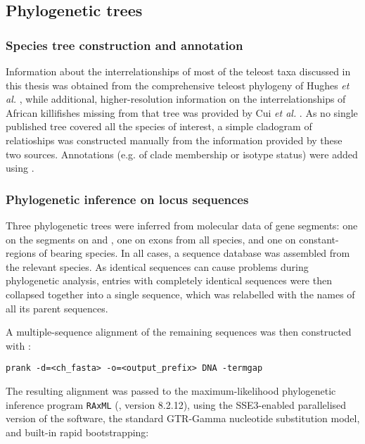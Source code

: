 \subsection{Phylogenetic trees}
\label{sec:methods_comp_trees}


\subsubsection{Species tree construction and annotation}
\label{sec:methods_comp_trees_species}

Information about the interrelationships of most of the teleost taxa discussed in this thesis was obtained from the comprehensive teleost phylogeny of Hughes \textit{et al.} \parencite{hughes2018teleostphylo}, while additional, higher-resolution information on the interrelationships of African killifishes missing from that tree was provided by Cui \textit{et al.} \parencite{cui2019annual}. As no single published tree covered all the species of interest, a simple cladogram of relatioships was constructed manually from the information provided by these two sources. Annotations (e.g. of clade membership or isotype status) were added using  \parencite{guangchuang2018tidytree}.

\subsubsection{Phylogenetic inference on \igh{} locus sequences}
\label{sec:methods_comp_trees_phylo}

Three phylogenetic trees were inferred from molecular data of  gene segments: one on the \vh segments on \nfu and \xma, one on \ch exons from all species, and one on  constant-regions of  bearing species. In all cases, a sequence  database was assembled from the relevant species. As identical sequences can cause problems during phylogenetic analysis, entries with completely identical sequences  were then collapsed together into a single  sequence, which was relabelled with the names of all its parent sequences. 

A multiple-sequence alignment of the remaining sequences was then constructed with :

\begin{lstlisting}
prank -d=<ch_fasta> -o=<output_prefix> DNA -termgap
\end{lstlisting}

The resulting alignment was passed to the maximum-likelihood phylogenetic inference program \lstinline{RAxML} (\parencite{stamatakis2005raxml3,stamatakis2006raxml6,stamatakis2014raxml8}, version 8.2.12), using the SSE3-enabled parallelised version of the software, the standard GTR-Gamma nucleotide substitution model, and built-in rapid bootstrapping:

